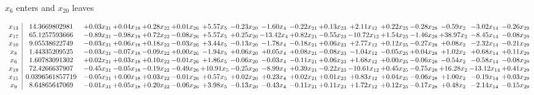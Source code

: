 \documentclass[9pt]{article}
\begin{document}
 $ x_{6} $ enters and $ x_{20} $ leaves 

 \[\begin{array}{c| c c@{\hskip 2pt} c@{\hskip 2pt} c@{\hskip 2pt} c@{\hskip 2pt} c@{\hskip 2pt} c@{\hskip 2pt} c@{\hskip 2pt} c@{\hskip 2pt} c@{\hskip 2pt} c@{\hskip 2pt} c@{\hskip 2pt} c@{\hskip 2pt} c@{\hskip 2pt} c@{\hskip 2pt} c@{\hskip 2pt} }
 x_{13}   &  14.3669802981 & +  0.03 x_{31} & +  0.04 x_{18} & +  0.28 x_{22} & +  0.01 x_{26} & +  5.57 x_{5} & -0.23 x_{20} & -1.60 x_{4} & -0.22 x_{21} & +  0.13 x_{23} & +  2.11 x_{12} & +  0.22 x_{25} & -0.28 x_{28} & -0.59 x_{2} & -3.02 x_{14} & -0.26 x_{29}\\
 x_{17}   &  65.1257593666 & -0.89 x_{31} & -0.98 x_{18} & +  0.72 x_{22} & -0.08 x_{26} & +  5.57 x_{5} & +  0.25 x_{20} & -13.42 x_{4} & +  0.82 x_{21} & -0.55 x_{23} & -10.72 x_{12} & +  1.54 x_{25} & -1.46 x_{28} & + 38.97 x_{2} & -8.45 x_{14} & -0.08 x_{29}\\
 x_{10}   &  9.05538622749 & -0.03 x_{31} & +  0.06 x_{18} & +  0.18 x_{22} & -0.03 x_{26} & +  3.44 x_{5} & -0.13 x_{20} & -1.78 x_{4} & -0.18 x_{21} & +  0.06 x_{23} & +  2.77 x_{12} & +  0.12 x_{25} & -0.27 x_{28} & +  0.08 x_{2} & -2.32 x_{14} & -0.21 x_{29}\\
 x_{8}   &  1.44335209525 & -0.03 x_{31} & -0.07 x_{18} & -0.09 x_{22} & +  0.00 x_{26} & -1.94 x_{5} & +  0.06 x_{20} & +  0.05 x_{4} & +  0.08 x_{21} & -0.08 x_{23} & -1.04 x_{12} & -0.05 x_{25} & +  0.04 x_{28} & +  1.02 x_{2} & +  0.68 x_{14} & +  0.11 x_{29}\\
 x_{6}   &  1.60783091302 & +  0.02 x_{31} & +  0.03 x_{18} & +  0.10 x_{22} & -0.01 x_{26} & +  1.86 x_{5} & -0.06 x_{20} & -0.03 x_{4} & -0.11 x_{21} & +  0.06 x_{23} & +  1.68 x_{12} & +  0.00 x_{25} & -0.06 x_{28} & -0.54 x_{2} & -0.58 x_{14} & -0.08 x_{29}\\
 x_{19}   &  72.4266637907 & -0.45 x_{31} & -0.05 x_{18} & -0.19 x_{22} & -0.49 x_{26} & + 10.91 x_{5} & -0.25 x_{20} & -8.99 x_{4} & +  0.39 x_{21} & -0.22 x_{23} & -10.61 x_{12} & +  0.45 x_{25} & -0.75 x_{28} & + 16.28 x_{2} & -13.12 x_{14} & +  0.41 x_{29}\\
 x_{15}   &  0.0396561857719 & -0.05 x_{31} & +  0.00 x_{18} & +  0.03 x_{22} & -0.01 x_{26} & +  0.57 x_{5} & +  0.02 x_{20} & +  0.23 x_{4} & +  0.02 x_{21} & +  0.01 x_{23} & +  0.83 x_{12} & +  0.04 x_{25} & -0.06 x_{28} & +  1.00 x_{2} & -0.19 x_{14} & +  0.03 x_{29}\\
 x_{9}   &  8.64865647069 & -0.01 x_{31} & +  0.05 x_{18} & +  0.20 x_{22} & -0.06 x_{26} & +  3.98 x_{5} & -0.13 x_{20} & -0.43 x_{4} & -0.11 x_{21} & +  0.11 x_{23} & +  1.72 x_{12} & +  0.12 x_{25} & -0.17 x_{28} & +  0.48 x_{2} & -2.14 x_{14} & -0.15 x_{29}\\

\end{array}\]
\end{document}

